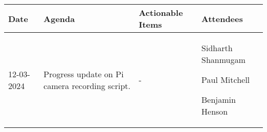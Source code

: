 \begin{table}[!h]
    \centering
    \begin{tabularx}{\textwidth}{|l|X|X|X|}
        \hline
        Date & Agenda & Actionable Items & Attendees \\
        \hline
        \hline
        12-03-2024 & 
        \begin{myitemize}
            \item Progress update on Pi camera recording script.
        \end{myitemize} & 
        \begin{myitemize}
            -
        \end{myitemize} & 
        \begin{myitemize}
            \item Sidharth Shanmugam
            \item Paul Mitchell
            \item Benjamin Henson
        \end{myitemize} \\
        \hline
    \end{tabularx}
\end{table}
